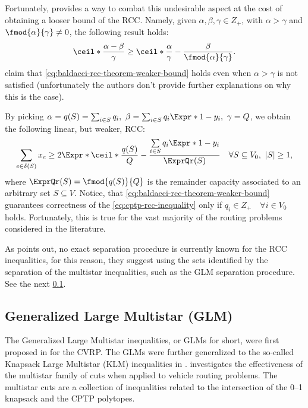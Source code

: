Fortunately, \textcite{baldacci2007capacitated} provides a way to
combat this undesirable aspect at the cost of obtaining a looser bound of the RCC.
Namely, given $\alpha, \beta, \gamma \in Z_+$, with $\alpha > \gamma$ and
$\fmod{\alpha}{\gamma} \ne 0$, the following result holds:
\begin{equation}
	\label{eq:baldacci-rcc-theorem-weaker-bound}
	\ceil*{\frac{\alpha - \beta}{\gamma}} \ge \ceil*{\frac{\alpha}{\gamma}} - \frac{\beta}{\fmod{\alpha}{\gamma}}.
\end{equation}
\textcite{jepsen2014} claim that \cref{eq:baldacci-rcc-theorem-weaker-bound}
holds even when $\alpha > \gamma$ is not satisfied
(unfortunately the authors don't provide further explanations on why this is the case).

By picking $\alpha = q(S) = \sum_{i \in S} q_i,\ \beta = \sum_{i \in S} q_i\Expr*{1 - y_i},\ \gamma = Q$,
we obtain the following linear, but weaker, RCC:
\begin{equation}
	\label{eq:cptp-rcc-inequality}
	\sum\limits_{e \in \delta(S)} x_e \ge 2 \Expr*{\ceil*{\frac{q(S)}{Q}} - \frac{\sum\limits_{i \in S} q_i \Expr*{1 - y_i}}{\ExprQr(S)}} \quad \forall S \subseteq V_0,\ |S| \ge 1,
\end{equation}
where $\ExprQr(S) = \fmod{q(S)}{Q}$ is the remainder capacity associated
to an arbitrary set $S \subseteq V$.
Notice, that \cref{eq:baldacci-rcc-theorem-weaker-bound} guarantees correctness
of the \cref{eq:cptp-rcc-inequality} only if $q_i \in Z_+ \quad \forall i \in V_0$ holds.
Fortunately, this is true for the vast majority of the routing problems considered in the literature.

As \textcite{jepsen2014} points out,
no exact separation procedure is currently known for the RCC inequalities,
for this reason,
they suggest using the sets identified by the separation of the multistar inequalities,
such as the GLM separation procedure.
See the next \cref{sec:cptp-glm}.

\subsection{Generalized Large Multistar (GLM)}
\label{sec:cptp-glm}

The Generalized Large Multistar inequalities,
or GLMs for short,
were first proposed in \textcite{gouveia1995} for the CVRP.
The GLMs were further generalized
to the so-called Knapsack Large Multistar (KLM) inequalities in \textcite{letchford2002}.
\textcite{letchford2006} investigates the effectiveness of the multistar family of cuts
when applied to vehicle routing problems.
The multistar cuts are a collection of inequalities
related to the intersection  of the 0--1 knapsack and the CPTP polytopes.

